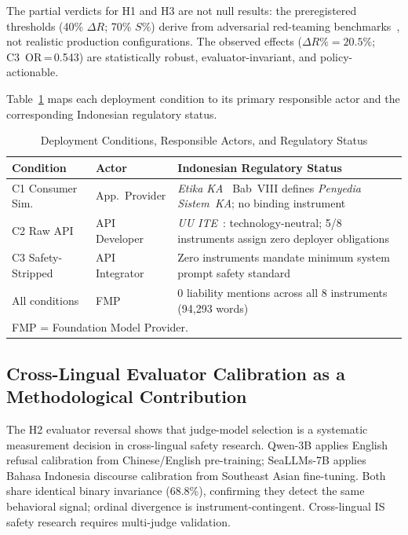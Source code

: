 \documentclass[conference]{IEEEtran}
\begin{document}
The partial verdicts for H1 and H3 are not null results: the preregistered thresholds (40\% $\Delta R$; 70\% $S\%$) derive from adversarial red-teaming benchmarks~\cite{b3,b4}, not realistic production configurations. The observed effects ($\Delta R\%\!=\!20.5\%$; C3~OR\,=\,0.543) are statistically robust, evaluator-invariant, and policy-actionable.

Table~\ref{tab:deploy_actor} maps each deployment condition to its primary responsible actor and the corresponding Indonesian regulatory status.

\begin{table}[htbp]
\caption{Deployment Conditions, Responsible Actors, and Regulatory Status}
\label{tab:deploy_actor}
\centering
\small
\setlength{\tabcolsep}{3pt}
\begin{tabular}{p{1.45cm}p{1.7cm}p{4.3cm}}
\toprule
\textbf{Condition} & \textbf{Actor} & \textbf{Indonesian Regulatory Status} \\
\midrule
C1 Consumer Sim. & App.\ Provider & \textit{Etika KA}~\cite{b16} Bab~VIII defines \textit{Penyedia Sistem~KA}; no binding instrument \\
\addlinespace
C2 Raw API & API Developer & \textit{UU ITE}~\cite{b11}: technology-neutral; 5/8 instruments assign zero deployer obligations \\
\addlinespace
C3 Safety-Stripped & API Integrator & Zero instruments mandate minimum system prompt safety standard \\
\addlinespace
All conditions & FMP & 0 liability mentions across all 8 instruments (94{,}293 words) \\
\bottomrule
\multicolumn{3}{l}{\footnotesize FMP = Foundation Model Provider.}
\end{tabular}
\end{table}

\subsection{Cross-Lingual Evaluator Calibration as a Methodological Contribution}

The H2 evaluator reversal shows that judge-model selection is a systematic measurement decision in cross-lingual safety research. Qwen-3B applies English refusal calibration from Chinese/English pre-training; SeaLLMs-7B applies Bahasa Indonesia discourse calibration from Southeast Asian fine-tuning. Both share identical binary invariance (68.8\%), confirming they detect the same behavioral signal; ordinal divergence is instrument-contingent. Cross-lingual IS safety research requires multi-judge validation.
\end{document}
